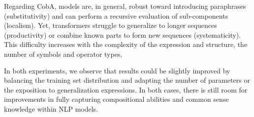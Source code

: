 Regarding CobA, models are, in general, robust toward introducing paraphrases (substitutivity) and can perform a recursive evaluation of sub-components (localism). Yet, transformers struggle to generalize to longer sequences (productivity) or combine known parts to form new sequences (systematicity). This difficulty increases with the complexity of the expression and structure, the number of symbols and operator types. 

In both experiments, we observe that results could be slightly improved by balancing the training set distribution and adapting the number of parameters or the exposition to generalization expressions. In both cases, there is still room for improvements in fully capturing compositional abilities and common sense knowledge within NLP models.
